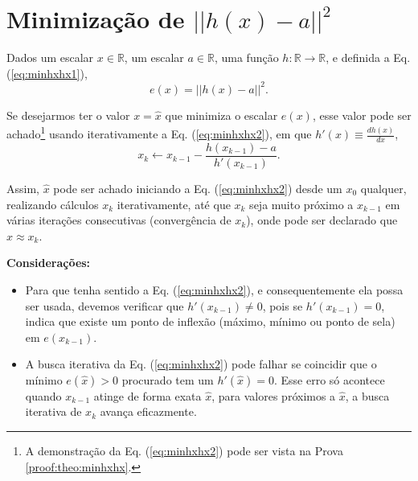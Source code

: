 \section{Minimização de $||h(x)-a||^2$} 




\begin{theorem}\label{theo:minhxhx}
Dados
um escalar $x \in \mathbb{R}$, 
um escalar $a \in \mathbb{R}$,  
uma função $h:\mathbb{R} \rightarrow \mathbb{R}$, e 
definida a Eq. (\ref{eq:minhxhx1}),
\begin{equation}\label{eq:minhxhx1}
e(x)=||h(x)-a||^2.
\end{equation}

Se desejarmos ter o valor $x=\hat{x}$ que minimiza o escalar $e(x)$,
esse valor pode ser achado\footnote{A 
demonstração da Eq. (\ref{eq:minhxhx2}) pode ser vista na Prova \ref{proof:theo:minhxhx}.} 
usando iterativamente a Eq. (\ref{eq:minhxhx2}),
em que  $h'(x)\equiv \frac{d h(x)}{d x}$,
\begin{equation}\label{eq:minhxhx2}
x_{k} \leftarrow x_{k-1}-
\frac{ h(x_{k-1})-a}{h'(x_{k-1})}.
\end{equation}


Assim, $\hat{x}$ pode ser achado iniciando a Eq. (\ref{eq:minhxhx2}) desde um 
$x_{0}$ qualquer, realizando cálculos $x_{k}$ iterativamente, 
até que $x_{k}$ seja muito próximo a $x_{k-1}$ em várias iterações consecutivas (convergência de $x_{k}$),
onde pode ser declarado que $\hat{x} \approx x_{k}$.

\textbf{Considerações:}
\begin{itemize} 
\item Para que tenha sentido a Eq. (\ref{eq:minhxhx2}),
 e consequentemente ela possa ser usada, devemos verificar que  $h'(x_{k-1})\neq 0$,
pois se $h'(x_{k-1})= 0$, indica que existe um ponto de inflexão 
(máximo, mínimo ou ponto de sela) em $e(x_{k-1})$.
\item A busca iterativa da Eq. (\ref{eq:minhxhx2}) pode falhar se coincidir que o mínimo $e(\hat{x})>0$ procurado
tem um $h'(\hat{x})= 0$.
Esse erro só acontece quando $x_{k-1}$ atinge de forma exata $\hat{x}$,
para valores próximos a $\hat{x}$, a busca iterativa de $x_{k}$ avança eficazmente.
\end{itemize}
\end{theorem}


